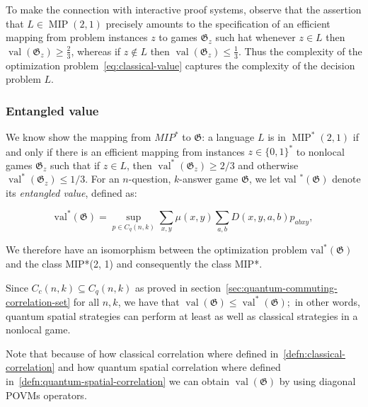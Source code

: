 To make the connection with interactive proof systems, observe that the assertion that $L \in \operatorname{MIP}(2,1)$ precisely amounts to the specification of an efficient mapping from problem instances $z$ to games $\mathfrak{G}_{z}$ such hat whenever $z \in L$ then $\operatorname{val}\left(\mathfrak{G}_{z}\right) \geq \frac{2}{3}$, whereas if $z \notin L$ then $\operatorname{val}\left(\mathfrak{G}_{z}\right) \leq \frac{1}{3}$. Thus the complexity of the optimization problem~\ref{eq:classical-value} captures the complexity of the decision problem $L$.

\subsubsection{Entangled value}\label{subsection:quantum-games}

We know show the mapping from $MIP^{*}$ to $\mathfrak{G}$: a language $L$ is in $\operatorname{MIP}^{*}(2,1)$ if and only if there is an efficient mapping from instances $z \in\{0,1\}^{*}$ to nonlocal games $\mathfrak{G}_{z}$ such that if $z \in L$, then $\operatorname{val}^{*}\left(\mathfrak{G}_{z}\right) \geq 2 / 3$ and otherwise $\operatorname{val}^{*}\left(\mathfrak{G}_{z}\right) \leq 1 / 3$.
 For an $n$-question, $k$-answer game $\mathfrak{G}$, we let val ${ }^{*}(\mathfrak{G})$ denote its \emph{entangled value}, defined as:

\begin{defn}\label{defn:entangled-value}
    \begin{equation}
    \operatorname{val^{*}}(\mathfrak{G})=\sup _{p \in C_{q}(n, k)} \sum_{x, y} \mu(x, y) \sum_{a, b} D(x, y, a, b) p_{a b x y},
    \end{equation}
\end{defn}


We therefore have an isomorphism between the optimization problem $\operatorname{val^{*}}(\mathfrak{G})$ and the class MIP*(2, 1) and consequently the class MIP*.


Since $C_{c}(n, k) \subseteq C_{q}(n, k)$ as proved in section~\ref{sec:quantum-commuting-correlation-set} for all $n, k$, we have that $\operatorname{val}(\mathfrak{G}) \leq \operatorname{val}^{*}(\mathfrak{G}) ;$ in other words, quantum spatial strategies can perform at least as well as classical strategies in a nonlocal game.

Note that because of how classical correlation where defined in~\ref{defn:classical-correlation} and how quantum spatial correlation where defined in~\ref{defn:quantum-spatial-correlation} we can obtain $\operatorname{val}(\mathfrak{G})$ by using diagonal POVMs operators.  

